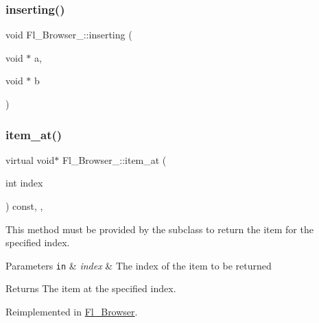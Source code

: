 \mbox{\label{class_fl___browser___a6ad26748441b4801ae10f55414e98f0a}} 
\subsubsection{\texorpdfstring{inserting()}{inserting()}}
{\footnotesize\ttfamily void Fl\+\_\+\+Browser\+\_\+\+::inserting (\begin{DoxyParamCaption}\item[{void $\ast$}]{a,  }\item[{void $\ast$}]{b }\end{DoxyParamCaption})\hspace{0.3cm}{\ttfamily [protected]}}

\mbox{\label{class_fl___browser___a6dd51e0b34953ddb1de33a750ab07c22}} 
\subsubsection{\texorpdfstring{item\+\_\+at()}{item\_at()}}
{\footnotesize\ttfamily virtual void$\ast$ Fl\+\_\+\+Browser\+\_\+\+::item\+\_\+at (\begin{DoxyParamCaption}\item[{int}]{index }\end{DoxyParamCaption}) const\hspace{0.3cm}{\ttfamily [inline]}, {\ttfamily [protected]}, {\ttfamily [virtual]}}

This method must be provided by the subclass to return the item for the specified {\ttfamily index}. 
\begin{DoxyParams}[1]{Parameters}
\mbox{\tt in}  & {\em index} & The {\ttfamily index} of the item to be returned \\
\hline
\end{DoxyParams}
\begin{DoxyReturn}{Returns}
The item at the specified {\ttfamily index}. 
\end{DoxyReturn}


Reimplemented in \hyperlink{class_fl___browser_aa1d22a122c794581b30183f045db2959}{Fl\+\_\+\+Browser}.

